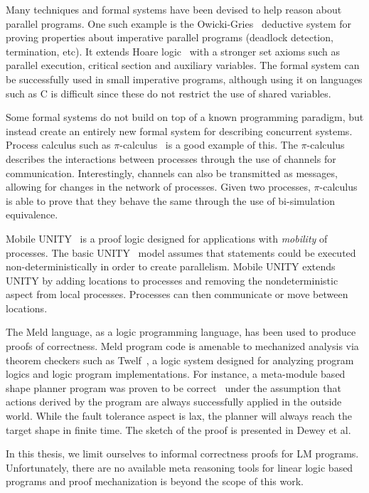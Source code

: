 Many techniques and formal systems have been devised to help reason about
parallel programs.  One such example is the
Owicki-Gries~\cite{Owicki:1976:VPP:360051.360224} deductive system for proving
properties about imperative parallel programs (deadlock detection, termination,
etc). It extends Hoare logic~\cite{Hoare:1969} with a stronger set axioms such
as parallel execution, critical section and auxiliary variables. The formal
system can be successfully used in small imperative programs, although using it
on languages such as C is difficult since these do not restrict the use of
shared variables.

Some formal systems do not build on top of a known programming paradigm, but
instead create an entirely new formal system for describing concurrent systems.
Process calculus such as $\pi$-calculus~\cite{Milner:1999:CMS:329902} is a good
example of this.  The $\pi$-calculus describes the interactions between
processes through the use of channels for communication. Interestingly, channels
can also be transmitted as messages, allowing for changes in the network of
processes.  Given two processes, $\pi$-calculus is able to prove that they
behave the same through the use of bi-simulation equivalence.

Mobile UNITY~\cite{Roman97anintroduction} is a proof logic designed for
applications with \emph{mobility} of processes. The basic UNITY~\cite{UNITY}
model assumes that statements could be executed non-deterministically in order
to create parallelism. Mobile UNITY extends UNITY by adding locations to
processes and removing the nondeterministic aspect from local processes.
Processes can then communicate or move between locations.

The Meld language, as a logic programming language, has been used to produce
proofs of correctness. Meld program code is amenable to mechanized analysis via
theorem checkers such as Twelf~\cite{twelf}, a logic system designed for
analyzing program logics and logic program implementations. For instance, a
meta-module based shape planner program was proven to be
correct~\cite{dewey-iros08,ashley-rollman-iclp09} under the assumption that
actions derived by the program are always successfully applied in the outside
world.  While the fault tolerance aspect is lax, the planner will always reach
the target shape in finite time. The sketch of the proof is presented in Dewey
et al.~\cite{dewey-iros08}

In this thesis, we limit ourselves to informal correctness proofs for LM
programs. Unfortunately, there are no available meta reasoning tools for linear
logic based programs and proof mechanization is beyond the scope of this work.
